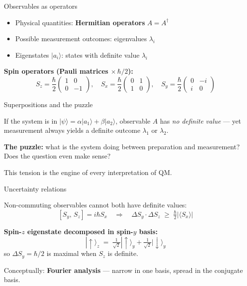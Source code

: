 \documentclass[fleql]{beamer}
\newcommand{\kw}[1]{\textbf{#1}}
\newcommand{\ket}[1]{|#1\rangle}
\begin{document}
\begin{frame}{Observables as operators}

  \begin{itemize}
  \item Physical quantities: \kw{Hermitian operators} $A = A^\dagger$
  \item Possible measurement outcomes: eigenvalues $\lambda_i$
  \item Eigenstates $\ket{a_i}$: states with definite value $\lambda_i$
  \end{itemize}

  \vspace{0.5em}
  \textbf{Spin operators (Pauli matrices $\times\,\hbar/2$):}
  \[
  S_z = \frac{\hbar}{2}\begin{pmatrix}1&0\\0&-1\end{pmatrix},\quad
  S_x = \frac{\hbar}{2}\begin{pmatrix}0&1\\1&0\end{pmatrix},\quad
  S_y = \frac{\hbar}{2}\begin{pmatrix}0&-i\\i&0\end{pmatrix}
  \]

\end{frame}

\begin{frame}{Superpositions and the puzzle}

  If the system is in $\ket{\psi} = \alpha\ket{a_1}+\beta\ket{a_2}$,
  observable $A$ has \emph{no definite value} --- yet measurement
  always yields a definite outcome $\lambda_1$ or $\lambda_2$.

  \vspace{0.5em}
  \textbf{The puzzle:} what is the system doing between preparation
  and measurement? Does the question even make sense?

  \vspace{0.5em}
  This tension is the engine of every interpretation of QM.

\end{frame}

\begin{frame}{Uncertainty relations}

  Non-commuting observables cannot both have definite values:
  \[
  [S_y,\,S_z] = i\hbar S_x
  \quad\Longrightarrow\quad
  \Delta S_y \cdot \Delta S_z \;\geq\;
  \tfrac{\hbar}{2}|\langle S_x\rangle|
  \]

  \textbf{Spin-$z$ eigenstate decomposed in spin-$y$ basis:}
  \[
  \ket{\uparrow}_z \;=\;
  \tfrac{1}{\sqrt{2}}\ket{\uparrow}_y + \tfrac{1}{\sqrt{2}}\ket{\downarrow}_y
  \]
  so $\Delta S_y = \hbar/2$ is maximal when $S_z$ is definite.

  \vspace{0.3em}
  Conceptually: \kw{Fourier analysis} --- narrow in one basis,
  spread in the conjugate basis.

\end{frame}
\end{document}

